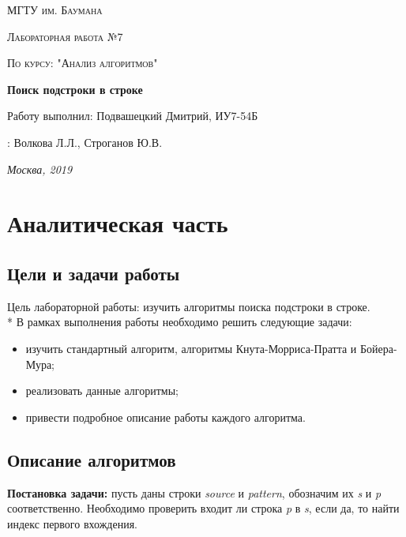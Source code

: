 \documentclass[12pt]{report}
\begin{document}
	
	\begin{titlepage}
		\centering
		{\scshape\LARGE МГТУ им. Баумана \par}
		\vspace{3cm}
		{\scshape\Large Лабораторная работа №7\par}
		\vspace{0.5cm}	
		{\scshape\Large По курсу: "Анализ алгоритмов"\par}
		\vspace{1.5cm}
		{\huge\bfseries Поиск подстроки в строке\par}
		\vspace{2cm}
		\Large Работу выполнил: Подвашецкий Дмитрий, ИУ7-54Б\par
		\vspace{0.5cm}
		:  Волкова Л.Л., Строганов Ю.В.\par
		
		\vfill
		\large \textit {Москва, 2019} \par
	\end{titlepage}
	
	\tableofcontents


	\chapter{Аналитическая часть}
	\section{Цели и задачи работы}


Цель лабораторной работы: изучить алгоритмы поиска подстроки в строке. \\*
В рамках выполнения работы необходимо решить следующие задачи:
\begin{itemize}
	\item изучить стандартный алгоритм, алгоритмы Кнута-Морриса-Пратта и Бойера-Мура;
	\item реализовать данные алгоритмы;
	\item привести подробное описание работы каждого алгоритма.
\end{itemize}


	\section{Описание алгоритмов}


\textbf{Постановка задачи:} пусть даны строки \textit{source} и \textit{pattern}, обозначим их \textit{s} и \textit{p} соответственно.  
Необходимо проверить входит ли строка \textit{p} в \textit{s}, если да, то найти индекс первого вхождения.
\end{document}

